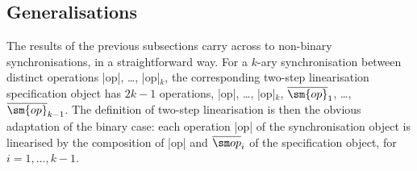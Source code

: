 
\subsection{Generalisations}
\label{ssec:relating-variations}

The results of the previous subsections carry across to non-binary
synchronisations, in a straightforward way.  For a $k$-ary synchronisation
between distinct operations |op|, \ldots, |op|$_k$, the corresponding
two-step linearisation specification object has $2k-1$ operations, |op|,
\ldots, |op|$_k$, $\overline{\sm{op}}_1$, \ldots, $\overline{\sm{op}}_{k-1}$.
The definition of two-step linearisation is then the obvious adaptation of the
binary case: each operation |op| of the synchronisation object is
linearised by the composition of |op| and $\overline{\op}_i$ of the
specification object, for $i = 1, \ldots, k-1$.



